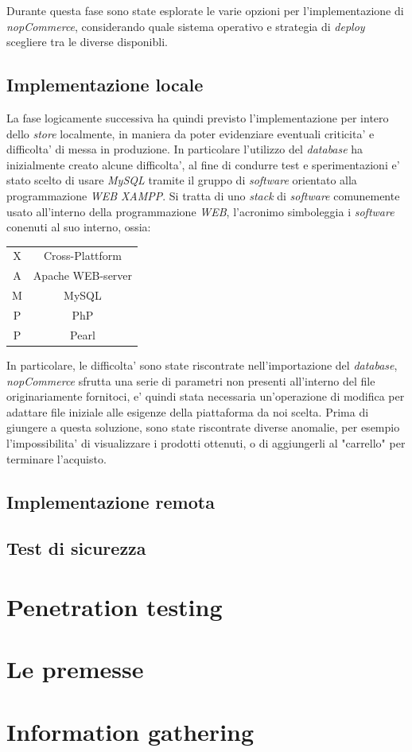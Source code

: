 \documentclass[a4paper]{report}
\begin{document}
		Durante questa fase sono state esplorate le varie opzioni per l'implementazione di \emph{nopCommerce},
		considerando quale sistema operativo e strategia di \emph{deploy} scegliere tra le diverse disponibli.
		\section{Implementazione locale}
		La fase logicamente successiva ha quindi previsto l'implementazione per intero dello \emph{store} localmente,
		in maniera da poter evidenziare eventuali criticita' e difficolta' di messa in produzione. In particolare
		l'utilizzo del \emph{database} ha inizialmente creato alcune difficolta', al fine di condurre test e
		sperimentazioni e' stato scelto di usare \emph{MySQL} tramite il gruppo di \emph{software} orientato alla
		programmazione \emph{WEB} \emph{XAMPP}. Si tratta di uno \emph{stack} di \emph{software} comunemente usato
		all'interno della programmazione \emph{WEB}, l'acronimo simboleggia i \emph{software} conenuti al suo interno,
		ossia:
		\begin{center}
			\begin{tabular}{c|c}
				X & Cross-Plattform \\
				A & Apache WEB-server \\
				M & MySQL \\
				P & PhP \\
				P & Pearl \\
			\end{tabular}
		\end{center}
		In particolare, le difficolta' sono state riscontrate nell'importazione del \emph{database}, \emph{nopCommerce}
		sfrutta una serie di parametri non presenti all'interno del file originariamente fornitoci, e' quindi stata
		necessaria un'operazione di modifica per adattare file iniziale alle esigenze della piattaforma da noi scelta.
		Prima di giungere a questa soluzione, sono state riscontrate diverse anomalie, per esempio l'impossibilita' di
		visualizzare i prodotti ottenuti, o di aggiungerli al "carrello" per terminare l'acquisto.
	 \section{Implementazione remota}%
	\section{Test di sicurezza}

\chapter{Penetration testing}
	\chapter{Le premesse}
	\chapter{Information gathering}
\end{document}
